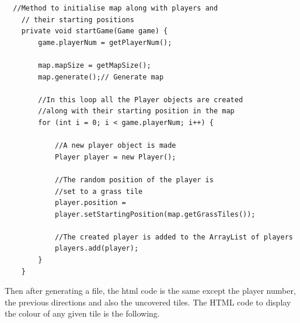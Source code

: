 \documentclass[a4paper,12pt]{extarticle}
\begin{document}
\newpage
\begin{lstlisting}
  //Method to initialise map along with players and
    // their starting positions
    private void startGame(Game game) {
        game.playerNum = getPlayerNum();

        map.mapSize = getMapSize();
        map.generate();// Generate map

        //In this loop all the Player objects are created 
        //along with their starting position in the map
        for (int i = 0; i < game.playerNum; i++) {

            //A new player object is made
            Player player = new Player();

            //The random position of the player is 
            //set to a grass tile
            player.position = 
            player.setStartingPosition(map.getGrassTiles());

            //The created player is added to the ArrayList of players
            players.add(player);
        }
    }
\end{lstlisting}
\vspace{4mm}

\noindent Then after generating a file, the html code is the same except the player number, the previous directions and also the uncovered tiles. The HTML code to display the colour of any given tile is the following.
\end{document}
